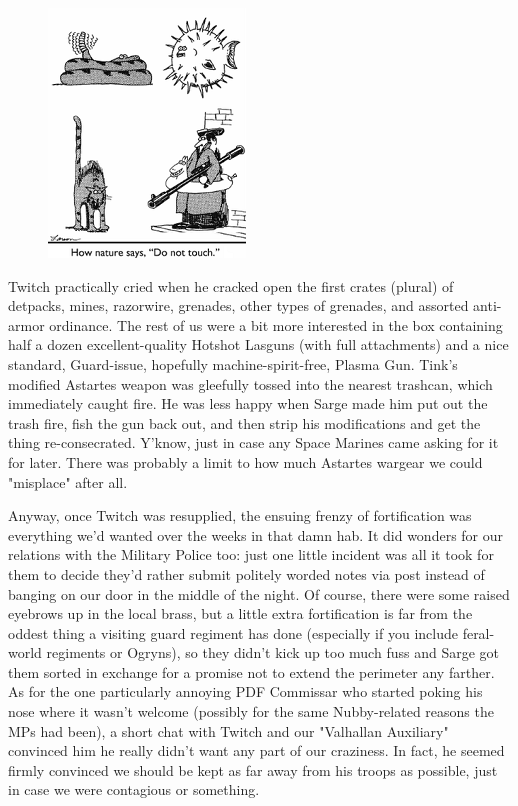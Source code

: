 \begin{figure}
	\begin{center}
		\includegraphics[width=\figwidth]{pics/19/26.png}
	\end{center}
\end{figure}
Twitch practically cried when he cracked open the first crates (plural) of detpacks, mines, razorwire, grenades, other types of grenades, and assorted anti-armor ordinance. 
The rest of us were a bit more interested in the box containing half a dozen excellent-quality Hotshot Lasguns (with full attachments) and a nice standard, Guard-issue, hopefully machine-spirit-free, Plasma Gun. 
Tink's modified Astartes weapon was gleefully tossed into the nearest trashcan, which immediately caught fire. 
He was less happy when Sarge made him put out the trash fire, fish the gun back out, and then strip his modifications and get the thing re-consecrated. 
Y'know, just in case any Space Marines came asking for it for later. 
There was probably a limit to how much Astartes wargear we could "misplace" after all.

Anyway, once Twitch was resupplied, the ensuing frenzy of fortification was everything we'd wanted over the weeks in that damn hab. 
It did wonders for our relations with the Military Police too: 
just one little incident was all it took for them to decide they'd rather submit politely worded notes via post instead of banging on our door in the middle of the night. 
Of course, there were some raised eyebrows up in the local brass, but a little extra fortification is far from the oddest thing a visiting guard regiment has done (especially if you include feral-world regiments or Ogryns), so they didn't kick up too much fuss and Sarge got them sorted in exchange for a promise not to extend the perimeter any farther. 
As for the one particularly annoying PDF Commissar who started poking his nose where it wasn't welcome (possibly for the same Nubby-related reasons the MPs had been), a short chat with Twitch and our "Valhallan Auxiliary" convinced him he really didn't want any part of our craziness. 
In fact, he seemed firmly convinced we should be kept as far away from his troops as possible, just in case we were contagious or something.

